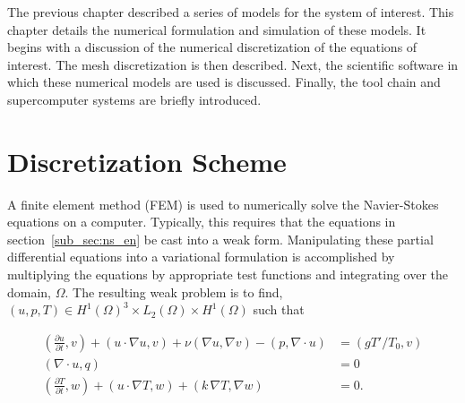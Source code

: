 \label{sec:software}

The previous chapter described a series of models 
for the system of interest. 
This chapter details the numerical formulation
and simulation of these models. It begins with a 
discussion of the numerical discretization of the equations 
of interest. The mesh discretization is then described. 
Next, the scientific software in which these numerical 
models are used is discussed. Finally, the tool
chain and supercomputer systems are briefly introduced. 

\section{Discretization Scheme}

A finite element method (FEM) is used to numerically solve the
Navier-Stokes equations on a computer. 
Typically, this requires that the equations
in section~\ref{sub_sec:ns_en} be cast into a weak form. Manipulating
these partial differential equations into a variational formulation is
accomplished by multiplying the equations by appropriate test functions
and integrating over the domain, $\Omega$. The resulting weak problem is
to find, $(u,p,T) \in H^1(\Omega)^3 \times L_2(\Omega) \times
H^1(\Omega)$ such that 

%
%
\begin{align}
  (\frac{\partial u}{\partial t}, v) + (u \cdot \nabla u,v) + \nu
   (\nabla u, \nabla v)  
  -(p,\nabla \cdot u) &= (gT'/T_0,v)
 \label{eqn:ns_weak} \\
 (\nabla \cdot u,q) &= 0
 \label{eqn:cont_weak} \\
 (\frac{\partial T}{\partial t}, w) + (u \cdot \nabla T, w) + (k \, \nabla
 T, \nabla w) &= 0.\label{eqn:en_weak}
\end{align}

